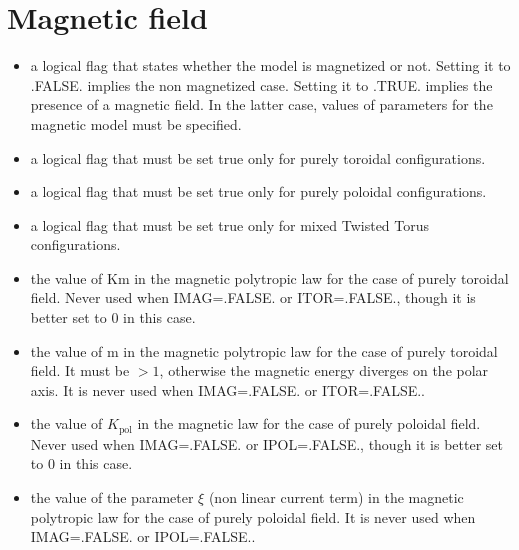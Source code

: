 \documentclass[letterpaper,10pt,english]{sphinxmanual}
\begin{document}
\section{Magnetic field}
\label{\detokenize{user_params:magnetic-field}}
\sphinxAtStartPar
{}
\begin{itemize}
\item {} 
\sphinxAtStartPar
{} \sphinxhyphen{} a logical flag that states whether the model is magnetized or not. Setting it to .FALSE. implies
the non magnetized case. Setting it to .TRUE. implies the presence of a magnetic field. In the latter
case, values of parameters for the magnetic model must be specified.


\item {} 
\sphinxAtStartPar
{} \sphinxhyphen{} a logical flag that must be set true only for purely toroidal configurations.


\item {} 
\sphinxAtStartPar
{} \sphinxhyphen{} a logical flag that must be set true only for purely poloidal configurations.


\item {} 
\sphinxAtStartPar
{} \sphinxhyphen{} a logical flag that must be set true only for mixed Twisted Torus configurations.


\item {} 
\sphinxAtStartPar
{} \sphinxhyphen{} the value of Km in the magnetic polytropic law for the case of purely toroidal field. Never
used when IMAG=.FALSE. or ITOR=.FALSE., though it is better set to 0 in this case.


\item {} 
\sphinxAtStartPar
{} \sphinxhyphen{} the value of m in the magnetic polytropic law for the case of purely toroidal field. It must be \(> 1\), otherwise the magnetic energy diverges on the polar axis. It is never used when IMAG=.FALSE.
or ITOR=.FALSE..


\item {} 
\sphinxAtStartPar
{} \sphinxhyphen{} the value of \(K_\mathrm{pol}\) in the magnetic law for the case of purely poloidal field. Never used when
IMAG=.FALSE. or IPOL=.FALSE., though it is better set to 0 in this case.


\item {} 
\sphinxAtStartPar
{} \sphinxhyphen{} the value of the parameter \(\xi\) (non linear current term) in the magnetic polytropic law for the
case of purely poloidal field. It is never used when IMAG=.FALSE. or IPOL=.FALSE..


\end{itemize}
\end{document}
